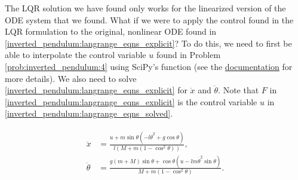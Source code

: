 The LQR solution we have found only works for the linearized version of the ODE system that we found. What if we were to apply the control found in the LQR formulation to the original, nonlinear ODE found in \eqref{inverted_pendulum:langrange_eqns_explicit}?
To do this, we need to first be able to interpolate the control variable $u$ found in Problem \ref{prob:inverted_pendulum:4} using SciPy's  function (see the \href{https://docs.scipy.org/doc/scipy/reference/generated/scipy.interpolate.CubicSpline.html}{documentation} for more details).
We also need to solve \eqref{inverted_pendulum:langrange_eqns_explicit} for $\ddot x$ and $\ddot \theta$. Note that $F$ in \eqref{inverted_pendulum:langrange_eqns_explicit} is the control variable $u$ in \eqref{inverted_pendulum:langrange_eqns_solved}.


\begin{align}
	\begin{split}
		\ddot x &= \frac{u+m\sin\theta(-l\dot \theta^2+g\cos\theta)}{l(M+m(1-\cos^2\theta))},\\
		\ddot{\theta} &= \frac{g(m+M)\sin\theta+\cos\theta(u-lm\dot\theta^2\sin\theta)}{M+m(1-\cos^2\theta)}.
	\end{split}\label{inverted_pendulum:langrange_eqns_solved}
\end{align}

